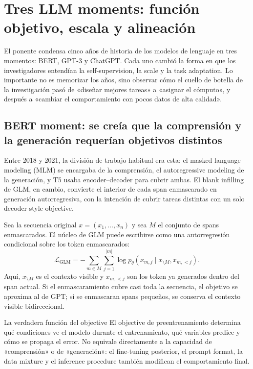 \section{Tres LLM moments: función objetivo, escala y alineación}

El ponente condensa cinco años de historia de los modelos de lenguaje en tres momentos: BERT, GPT-3 y ChatGPT. Cada uno cambió la forma en que los investigadores entendían la self-supervision, la scale y la task adaptation. Lo importante no es memorizar los años, sino observar cómo el cuello de botella de la investigación pasó de «diseñar mejores tareas» a «asignar el cómputo», y después a «cambiar el comportamiento con pocos datos de alta calidad».

\subsection{BERT moment: se creía que la comprensión y la generación requerían objetivos distintos}

Entre 2018 y 2021, la división de trabajo habitual era esta: el masked language modeling (MLM) se encargaba de la comprensión, el autoregressive modeling de la generación, y T5 usaba encoder--decoder para cubrir ambas. El blank infilling de GLM, en cambio, convierte el interior de cada span enmascarado en generación autorregresiva, con la intención de cubrir tareas distintas con un solo decoder-style objective.


Sea la secuencia original $x=(x_1,\ldots,x_n)$ y sea $M$ el conjunto de spans enmascarados. El núcleo de GLM puede escribirse como una autorregresión condicional sobre los token enmascarados:
\[
\mathcal{L}_{\text{GLM}}
=-\sum_{m\in M}\sum_{j=1}^{|m|}
\log p_\theta\!\left(x_{m,j}\mid x_{\setminus M},x_{m,<j}\right).
\]
Aquí, $x_{\setminus M}$ es el contexto visible y $x_{m,<j}$ son los token ya generados dentro del span actual. Si el enmascaramiento cubre casi toda la secuencia, el objetivo se aproxima al de GPT; si se enmascaran spans pequeños, se conserva el contexto visible bidireccional.

\begin{knowledgebox}{La verdadera función del objective}
El objective de preentrenamiento determina qué condiciones ve el modelo durante el entrenamiento, qué variables predice y cómo se propaga el error. No equivale directamente a la capacidad de «comprensión» o de «generación»: el fine-tuning posterior, el prompt format, la data mixture y el inference procedure también modifican el comportamiento final.
\end{knowledgebox}

